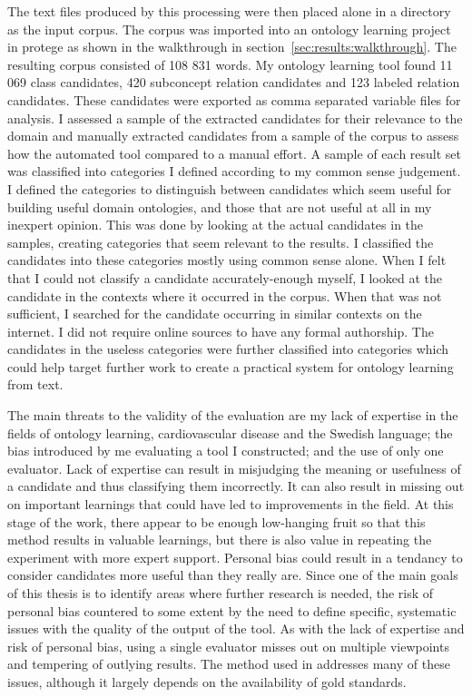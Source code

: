 \documentclass[a4paper]{report}
\begin{document}
The text files produced by this processing were then placed alone in a directory as the input corpus.
The corpus was imported into an ontology learning project in protege as shown in the walkthrough in section~\ref{sec:results:walkthrough}.
The resulting corpus consisted of 108 831 words.
My ontology learning tool found 11 069 class candidates, 420 subconcept relation candidates and 123 labeled relation candidates.
These candidates were exported as comma separated variable files for analysis.
I assessed a sample of the extracted candidates for their relevance to the domain and manually extracted candidates from a sample of the corpus to assess how the automated tool compared to a manual effort.
A sample of each result set was classified into categories I defined according to my common sense judgement.
I defined the categories to distinguish between candidates which seem useful for building useful domain ontologies, and those that are not useful at all in my inexpert opinion.
This was done by looking at the actual candidates in the samples, creating categories that seem relevant to the results.
I classified the candidates into these categories mostly using common sense alone.
When I felt that I could not classify a candidate accurately-enough myself, I looked at the candidate in the contexts where it occurred in the corpus.
When that was not sufficient, I searched for the candidate occurring in similar contexts on the internet.
I did not require online sources to have any formal authorship.
The candidates in the useless categories were further classified into categories which could help target further work to create a practical system for ontology learning from text.

The main threats to the validity of the evaluation are my lack of expertise in the fields of ontology learning, cardiovascular disease and the Swedish language; the bias introduced by me evaluating a tool I constructed; and the use of only one evaluator.
Lack of expertise can result in misjudging the meaning or usefulness of a candidate and thus classifying them incorrectly.
It can also result in missing out on important learnings that could have led to improvements in the field.
At this stage of the work, there appear to be enough low-hanging fruit so that this method results in valuable learnings, but there is also value in repeating the experiment with more expert support.
Personal bias could result in a tendancy to consider candidates more useful than they really are.
Since one of the main goals of this thesis is to identify areas where further research is needed, the risk of personal bias countered to some extent by the need to define specific, systematic issues with the quality of the output of the tool.
As with the lack of expertise and risk of personal bias, using a single evaluator misses out on multiple viewpoints and tempering of outlying results.
The method used in \cite{Zouaq11OntoCmaps} addresses many of these issues, although it largely depends on the availability of gold standards.
\end{document}

